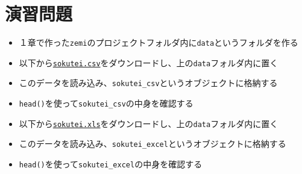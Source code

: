 \documentclass[
]{book}
\providecommand{\tightlist}{%
  \setlength{\itemsep}{0pt}\setlength{\parskip}{0pt}}
\begin{document}
\hypertarget{ux6f14ux7fd2ux554fux984c-3}{%
\section{演習問題}\label{ux6f14ux7fd2ux554fux984c-3}}

\begin{itemize}
\tightlist
\item
  １章で作った\texttt{zemi}のプロジェクトフォルダ内に\texttt{data}というフォルダを作る
\item
  以下から\href{https://www.dropbox.com/s/8fy2dbnurinract/shitaisokutei.csv?dl=0}{\texttt{sokutei.csv}}をダウンロードし、上の\texttt{data}フォルダ内に置く
\item
  このデータを読み込み、\texttt{sokutei\_csv}というオブジェクトに格納する
\item
  \texttt{head()}を使って\texttt{sokutei\_csv}の中身を確認する
\item
  以下から\href{https://www.dropbox.com/s/m4m4etyd81pnpq6/sokutei.xls?dl=0}{\texttt{sokutei.xls}}をダウンロードし、上の\texttt{data}フォルダ内に置く
\item
  このデータを読み込み、\texttt{sokutei\_excel}というオブジェクトに格納する
\item
  \texttt{head()}を使って\texttt{sokutei\_excel}の中身を確認する
\end{itemize}

  
\end{document}
